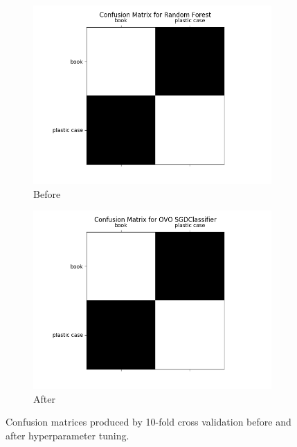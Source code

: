 \documentclass[12pt]{article}
\begin{document}
\begin{figure}[!ht]
\centering
\begin{subfigure}{.5\textwidth}
  \centering
  \includegraphics[width=\linewidth]{images/btestrf}
	\caption{Before}
  \label{fig:brf}
\end{subfigure}%
\begin{subfigure}{.5\textwidth}
  \centering
  \includegraphics[width=\linewidth]{images/btestsgd}
  \caption{After}
  \label{fig:bsgd}
\end{subfigure}
\caption{Confusion matrices produced by 10-fold cross validation before and after hyperparameter tuning.}
\label{fig:testbinary}
\end{figure}
\end{document}
